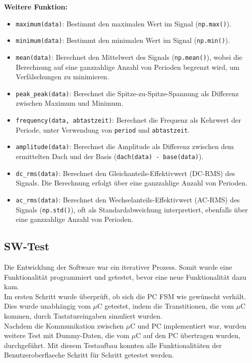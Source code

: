 \documentclass[a4paper, portrait, 12pt]{scrartcl} %
\begin{document}
\textbf{Weitere Funktion:}
\begin{itemize}
    \item \texttt{maximum(data)}: Bestimmt den maximalen Wert im Signal (\texttt{np.max()}).
    \item \texttt{minimum(data)}: Bestimmt den minimalen Wert im Signal (\texttt{np.min()}).
    \item \texttt{mean(data)}: Berechnet den Mittelwert des Signals (\texttt{np.mean()}), wobei die Berechnung auf eine ganzzahlige Anzahl von Perioden begrenzt wird, um Verfälschungen zu minimieren.
    \item \texttt{peak\_peak(data)}: Berechnet die Spitze-zu-Spitze-Spannung als Differenz zwischen Maximum und Minimum.
    \item \texttt{frequency(data, abtastzeit)}: Berechnet die Frequenz als Kehrwert der Periode, unter Verwendung von \texttt{period} und \texttt{abtastzeit}.
    \item \texttt{amplitude(data)}: Berechnet die Amplitude als Differenz zwischen dem ermittelten Dach und der Basis (\texttt{dach(data) - base(data)}).
    \item \texttt{dc\_rms(data)}: Berechnet den Gleichanteils-Effektivwert (DC-RMS) des Signals. Die Berechnung erfolgt über eine ganzzahlige Anzahl von Perioden.
    \item \texttt{ac\_rms(data)}: Berechnet den Wechselanteils-Effektivwert (AC-RMS) des Signals (\texttt{np.std()}), oft als Standardabweichung interpretiert, ebenfalls über eine ganzzahlige Anzahl von Perioden.
\end{itemize}





\pagebreak

\subsection{SW-Test}
Die Entwicklung der Software war ein iterativer Prozess. Somit wurde eine Funktionalität programmiert und getestet, bevor eine neue Funktionalität dazu kam.\\

Im ersten Schritt wurde überprüft, ob sich die PC FSM wie gewünscht verhält. Dies wurde unabhängig vom $\mu$C getestet, indem die Transtitionen, die vom $\mu$C kommen, durch Tastatureingaben simuliert wurden.
\\

Nachdem die Kommunikation zwischen $\mu$C und PC implementiert war, wurden weitere Test mit Dummy-Daten, die vom $\mu$C auf den PC übertragen wurden, durchgeführt. Mit diesem Testaufbau konnten alle Funktionalitäten der Benutzeroberflaeche Schritt für Schritt getestet werden.
\\
\end{document}
